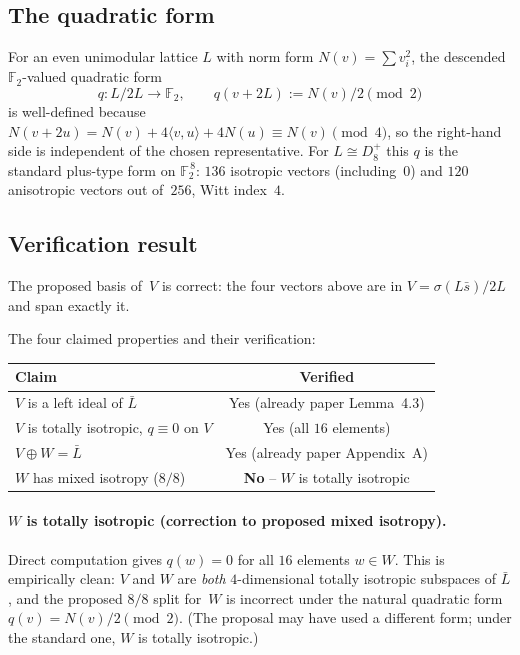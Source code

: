 \documentclass[11pt]{amsart}
\newcommand{\FF}{\mathbb{F}}
\newcommand{\Nrm}{N}
\begin{document}
\subsection*{The quadratic form}

For an even unimodular lattice $L$ with norm form $\Nrm(v) =
\sum v_i^2$, the descended $\FF_2$-valued quadratic form
\[
  q \colon L/2L \to \FF_2, \qquad
  q(v + 2L) := \Nrm(v)/2 \pmod{2}
\]
is well-defined because $\Nrm(v + 2u) = \Nrm(v) + 4 \langle v, u\rangle
+ 4 \Nrm(u) \equiv \Nrm(v) \pmod{4}$, so the right-hand side is
independent of the chosen representative. For $L \cong D_8^+$
this $q$ is the standard plus-type form on $\FF_2^{\,8}$: $136$
isotropic vectors (including~$0$) and $120$ anisotropic vectors out
of~$256$, Witt index~$4$.

\subsection*{Verification result}

The proposed basis of~$V$ is correct: the four vectors above are in
$V = \sigma(L\bar s)/2L$ and span exactly it.

The four claimed properties and their verification:

\begin{center}
\begin{tabular}{lc}
\toprule
Claim & Verified \\
\midrule
$V$ is a left ideal of $\bar L$ & Yes (already paper Lemma~4.3) \\
$V$ is totally isotropic, $q \equiv 0$ on $V$ & Yes (all $16$ elements)\\
$V \oplus W = \bar L$ & Yes (already paper Appendix~A) \\
$W$ has mixed isotropy ($8/8$) & \textbf{No} -- $W$ is totally isotropic \\
\bottomrule
\end{tabular}
\end{center}

\paragraph{$W$ is totally isotropic (correction to proposed mixed
isotropy).}
Direct computation gives $q(w) = 0$ for all $16$ elements
$w \in W$. This is empirically clean: $V$ and $W$ are \emph{both}
$4$-dimensional totally isotropic subspaces of $\bar L$, and the
proposed $8/8$ split for~$W$ is incorrect under the natural
quadratic form $q(v) = \Nrm(v)/2 \pmod 2$. (The proposal may have used
a different form; under the standard one, $W$ is totally isotropic.)
\end{document}
